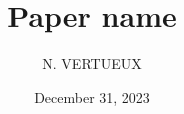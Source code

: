 \documentclass[]{cls/tools}
\begin{document}
\title{Paper name}

\author{N. VERTUEUX}
\date{December 31, 2023}

\maketitle
\end{document}
